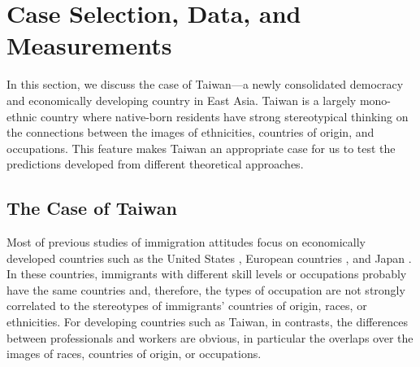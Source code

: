 \documentclass[12pt]{article}
\begin{document}















\section{Case Selection, Data, and Measurements}


In this section, we discuss the case of Taiwan---a newly consolidated democracy and economically developing country in East Asia. Taiwan is a largely mono-ethnic country where native-born residents have strong stereotypical thinking on the connections between the images of ethnicities, countries of origin, and occupations. This feature makes Taiwan an appropriate case for us to test the predictions developed from different theoretical approaches.


\subsection{The Case of Taiwan}


Most of previous studies of immigration attitudes focus on economically developed countries such as the United States \citep[e.g.,][]{Citrinetal1997, ScheveSlaughter2001}, European countries \citep[e.g.,][]{DustmannPreston2007, HainmuellerHiscox2007}, and Japan \citep{Green2017}. In these countries, immigrants with different skill levels or occupations probably have the same countries and, therefore, the types of occupation are not strongly correlated to the stereotypes of immigrants' countries of origin, races, or ethnicities. For developing countries such as Taiwan, in contrasts, the differences between professionals and workers are obvious, in particular the overlaps over the images of races, countries of origin, or occupations.
\end{document}
